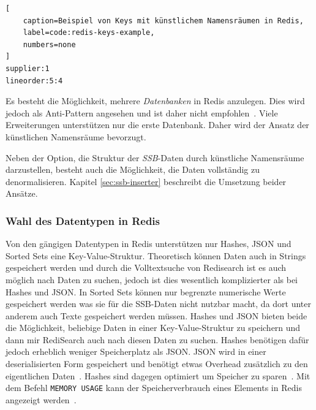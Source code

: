 \begin{lstlisting}[
    caption=Beispiel von Keys mit künstlichem Namensräumen in Redis,
    label=code:redis-keys-example,
    numbers=none
]
supplier:1
lineorder:5:4
\end{lstlisting}


Es besteht die Möglichkeit, mehrere \emph{Datenbanken} in Redis anzulegen.
Dies wird jedoch als Anti-Pattern angesehen und ist daher nicht empfohlen~\cite{prickett_answer_2022}. Viele Erweiterungen unterstützen nur die erste Datenbank. Daher wird der Ansatz der künstlichen Namensräume bevorzugt. 

Neben der Option, die Struktur der \emph{SSB}-Daten durch künstliche Namensräume darzustellen, besteht auch die Möglichkeit, die Daten vollständig zu denormalisieren. Kapitel \ref{sec:ssb-inserter} beschreibt die Umsetzung beider Ansätze.


\subsubsection{Wahl des Datentypen in Redis}
Von den gängigen Datentypen in Redis unterstützen nur Hashes, JSON und Sorted Sets eine Key-Value-Struktur. Theoretisch können Daten auch in Strings gespeichert werden und durch die Volltextsuche von Redisearch ist es auch möglich nach Daten zu suchen, jedoch ist dies wesentlich komplizierter als bei Hashes und JSON.
In Sorted Sets können nur begrenzte numerische Werte gespeichert werden was sie für die SSB-Daten nicht nutzbar macht, da dort unter anderem auch Texte gespeichert werden müssen.
Hashes und JSON bieten beide die Möglichkeit, beliebige Daten in einer Key-Value-Struktur zu speichern und dann mir RediSearch auch nach diesen Daten zu suchen.
Hashes benötigen dafür jedoch erheblich weniger Speicherplatz als JSON.
JSON wird in einer deserialisierten Form gespeichert und benötigt etwas Overhead zusätzlich zu den eigentlichen Daten~\cite{redis_ltd_json-ram-usage_nodate}.
Hashes sind dagegen optimiert um Speicher zu sparen~\cite{redis_ltd_memory-optimization_nodate}.
Mit dem Befehl \lstinline|MEMORY USAGE| kann der Speicherverbrauch eines Elements in Redis angezeigt werden~\cite{redis_ltd_memory-usage-command-redis_nodate}.

